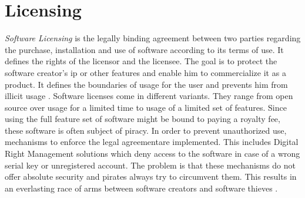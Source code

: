\section{Licensing} \label{subsection:introduction-licensing}
\textit{Software Licensing} is the legally binding agreement between two parties regarding the purchase, installation and use of software according to its terms of use.
It defines the rights of the licensor and the licensee.
The goal is to protect the software creator's \gls{ip} or other features and enable him to commercialize it as a product.
It defines the boundaries of usage for the user and prevents him from illicit usage \cite{uncgLicensing}.
\newline
Software licenses come in different variants.
They range from open source over usage for a limited time to usage of a limited set of features.
Since using the full feature set of software might be bound to paying a royalty fee, these software is often subject of piracy.
In order to prevent unauthorized use, mechanisms to enforce the legal agreementare implemented.
This includes Digital Right Management solutions which deny access to the software in case of a wrong serial key or unregistered account.
\newline
\newline
The problem is that these mechanisms do not offer absolute security and pirates always try to circumvent them.
This results in an everlasting race of arms between software creators and software thieves \cite{szCopy}.
